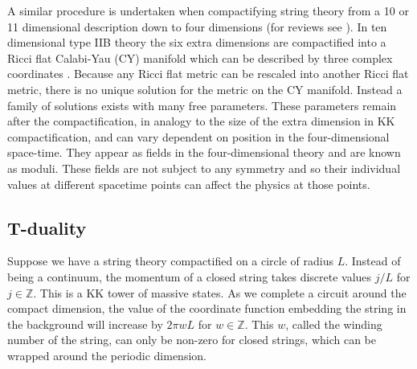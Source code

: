 A similar procedure is undertaken when compactifying string theory from a
10 or 11 dimensional description down to four dimensions (for reviews see
\cite{douglas,grana}).
In ten dimensional type IIB theory the six extra dimensions are
compactified into a Ricci flat Calabi-Yau (CY) manifold which can be described
by three complex coordinates \cite{Yau1977}. 
Because any Ricci flat metric can be
rescaled into another Ricci flat metric, there is no unique solution for the
metric on the CY manifold. Instead a family of solutions exists with many free
parameters. These parameters remain after the compactification, in
analogy to the size of the extra dimension in KK compactification, and can vary
dependent on position in the four-dimensional space-time. They appear as fields
in the four-dimensional theory and are known as moduli. 
These fields are not subject to any symmetry and so their individual values
at different spacetime points can affect the physics at those points.







\subsection{T-duality}
\label{sec:tduality-dbiintro}
Suppose we have a string theory compactified on a circle of radius $L$. Instead
of being a continuum, the momentum of a closed string takes discrete values
$j/L$ for $j \in \mathbb{Z}$. This is a KK tower of massive states. As we
complete a circuit around the compact dimension, the value of the coordinate
function embedding the string in the background will increase by $2\pi w
L$ for $w \in \mathbb{Z}$. This $w$, called the winding number of the string,
can only be non-zero for closed strings, which can be wrapped around the periodic
dimension.

